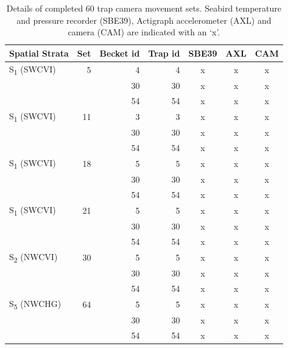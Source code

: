 \documentclass[12pt]{article}\usepackage[]{graphicx}\usepackage[]{color}
\begin{document}
\begin{table}[!h]

\caption{\label{tab:table3}Details of completed 60 trap camera movement sets. Seabird temperature and pressure recorder (SBE39), Actigraph accelerometer (AXL) and camera (CAM) are indicated with an `x'.}
\fontsize{9}{11}\selectfont
\begin{tabular}[t]{lrrrccc}
\toprule
\textbf{Spatial Strata} & \textbf{Set} & \textbf{Becket id} & \textbf{Trap id} & \textbf{SBE39} & \textbf{AXL} & \textbf{CAM}\\
\midrule
S\textsubscript{1} (SWCVI) & 5 & 4 & 4 & x & x & x\\
 &  & 30 & 30 & x & x & \vphantom{5} x\\
 &  & 54 & 54 & x & x & \vphantom{5} x\\
\midrule
S\textsubscript{1} (SWCVI) & 11 & 3 & 3 & x & x & x\\
 &  & 30 & 30 & x & x & \vphantom{4} x\\
 &  & 54 & 54 & x & x & \vphantom{4} x\\
\midrule
S\textsubscript{1} (SWCVI) & 18 & 5 & 5 & x & x & x\\
 &  & 30 & 30 & x & x & \vphantom{3} x\\
 &  & 54 & 54 & x & x & \vphantom{3} x\\
\midrule
S\textsubscript{1} (SWCVI) & 21 & 5 & 5 & x & x & x\\
 &  & 30 & 30 & x & x & \vphantom{2} x\\
 &  & 54 & 54 & x & x & \vphantom{2} x\\
\midrule
S\textsubscript{2} (NWCVI) & 30 & 5 & 5 & x & x & x\\
 &  & 30 & 30 & x & x & \vphantom{1} x\\
 &  & 54 & 54 & x & x & \vphantom{1} x\\
\midrule
S\textsubscript{5} (NWCHG) & 64 & 5 & 5 & x & x & x\\
 &  & 30 & 30 & x & x & x\\
 &  & 54 & 54 & x & x & x\\
\bottomrule
\end{tabular}
\end{table}
\clearpage
\end{document}
